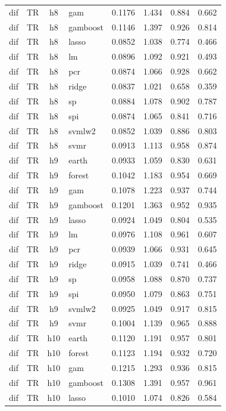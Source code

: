 \begin{ThreePartTable}
\begin{longtable}[t]{llclcccc}
dif & TR & h8 & gam & 0.1176 & 1.434 & 0.884 & 0.662\\
dif & TR & h8 & gamboost & 0.1146 & 1.397 & 0.926 & 0.814\\
dif & TR & h8 & lasso & 0.0852 & 1.038 & 0.774 & 0.466\\
dif & TR & h8 & lm & 0.0896 & 1.092 & 0.921 & 0.493\\
dif & TR & h8 & pcr & 0.0874 & 1.066 & 0.928 & 0.662\\
dif & TR & h8 & ridge & 0.0837 & 1.021 & 0.658 & 0.359\\
dif & TR & h8 & sp & 0.0884 & 1.078 & 0.902 & 0.787\\
dif & TR & h8 & spi & 0.0874 & 1.065 & 0.841 & 0.716\\
dif & TR & h8 & svmlw2 & 0.0852 & 1.039 & 0.886 & 0.803\\
dif & TR & h8 & svmr & 0.0913 & 1.113 & 0.958 & 0.874\\
\addlinespace
dif & TR & h9 & earth & 0.0933 & 1.059 & 0.830 & 0.631\\
dif & TR & h9 & forest & 0.1042 & 1.183 & 0.954 & 0.669\\
dif & TR & h9 & gam & 0.1078 & 1.223 & 0.937 & 0.744\\
dif & TR & h9 & gamboost & 0.1201 & 1.363 & 0.952 & 0.935\\
dif & TR & h9 & lasso & 0.0924 & 1.049 & 0.804 & 0.535\\
dif & TR & h9 & lm & 0.0976 & 1.108 & 0.961 & 0.607\\
dif & TR & h9 & pcr & 0.0939 & 1.066 & 0.931 & 0.645\\
dif & TR & h9 & ridge & 0.0915 & 1.039 & 0.741 & 0.466\\
dif & TR & h9 & sp & 0.0958 & 1.088 & 0.870 & 0.737\\
dif & TR & h9 & spi & 0.0950 & 1.079 & 0.863 & 0.751\\
dif & TR & h9 & svmlw2 & 0.0925 & 1.049 & 0.917 & 0.815\\
dif & TR & h9 & svmr & 0.1004 & 1.139 & 0.965 & 0.888\\
\addlinespace
dif & TR & h10 & earth & 0.1120 & 1.191 & 0.957 & 0.801\\
dif & TR & h10 & forest & 0.1123 & 1.194 & 0.932 & 0.720\\
dif & TR & h10 & gam & 0.1215 & 1.293 & 0.936 & 0.815\\
dif & TR & h10 & gamboost & 0.1308 & 1.391 & 0.957 & 0.961\\
dif & TR & h10 & lasso & 0.1010 & 1.074 & 0.826 & 0.584\\

\end{longtable}
\end{ThreePartTable}

